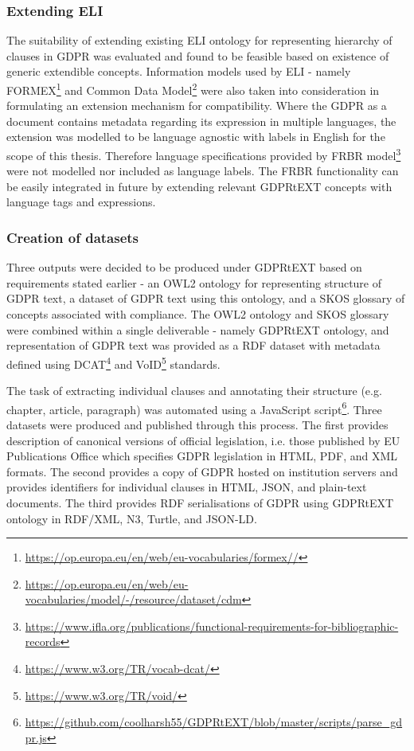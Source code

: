 \subsubsection{Extending ELI}
The suitability of extending existing ELI ontology for representing hierarchy of clauses in GDPR was evaluated and found to be feasible based on existence of generic extendible concepts. Information models used by ELI - namely FORMEX\footnote{\url{https://op.europa.eu/en/web/eu-vocabularies/formex//}} and Common Data Model\footnote{\url{https://op.europa.eu/en/web/eu-vocabularies/model/-/resource/dataset/cdm}} were also taken into consideration in formulating an extension mechanism for compatibility.
Where the GDPR as a document contains metadata regarding its expression in multiple languages, the extension was modelled to be language agnostic with labels in English for the scope of this thesis. Therefore language specifications provided by FRBR model\footnote{\url{https://www.ifla.org/publications/functional-requirements-for-bibliographic-records}} were not modelled nor included as language labels. The FRBR functionality can be easily integrated in future by extending relevant GDPRtEXT concepts with language tags and expressions.

\subsubsection{Creation of datasets}
Three outputs were decided to be produced under GDPRtEXT based on requirements stated earlier - an OWL2 ontology for representing structure of GDPR text, a dataset of GDPR text using this ontology, and a SKOS glossary of concepts associated with compliance. The OWL2 ontology and SKOS glossary were combined within a single deliverable - namely GDPRtEXT ontology, and representation of GDPR text was provided as a RDF dataset with metadata defined using DCAT\footnote{\url{https://www.w3.org/TR/vocab-dcat/}} and VoID\footnote{\url{https://www.w3.org/TR/void/}} standards.

The task of extracting individual clauses and annotating their structure (e.g. chapter, article, paragraph) was automated using a JavaScript script\footnote{\url{https://github.com/coolharsh55/GDPRtEXT/blob/master/scripts/parse_gdpr.js}}.
Three datasets were produced and published through this process. The first provides description of canonical versions of official legislation, i.e. those published by EU Publications Office which specifies GDPR legislation in HTML, PDF, and XML formats. The second provides a copy of GDPR hosted on institution servers and provides identifiers for individual clauses in HTML, JSON, and plain-text documents. The third provides RDF serialisations of GDPR using  GDPRtEXT ontology in RDF/XML, N3, Turtle, and JSON-LD.


